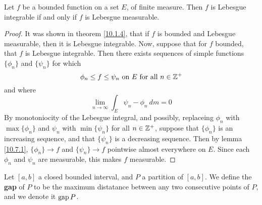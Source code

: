 \begin{theorem}\label{1.7.2}
    Let $f$ be a bounded function on a set $E$, of finite measure. Then $f$ is
    Lebesgue integrable if and only if  $f$ is Lebesgue measurable.
\end{theorem}
\begin{proof}
    It was shown in theorem \ref{10.1.4}, that if $f$ is bounded and Lebesgue
    measurable, then it is Lebesgue integrable. Now, suppose that for $f$
    bounded, that $f$ is Lebesgue integrable. Then there exists sequences of
    simple functions  $\{\phi_n\}$ and $\{\psi_n\}$ for which
    \begin{equation*}
        \phi_n \leq f \leq \psi_n \text{ on } E \text{ for all } n \in \mathbb{Z}^+
    \end{equation*}
    and where
    \begin{equation*}
        \lim_{n \xrightarrow{} \infty}{\int_E{\psi_n-\phi_n \ dm}}=0
    \end{equation*}
    By monotoniocity of the Lebesgue integral, and possibly, replaceing $\phi_n$
    with $\max{\{\phi_n\}}$ and $\psi_n$ with  $\min{\{\psi_n\}}$ for all $n \in
    \mathbb{Z}^+$, suppose that  $\{\phi_n\}$ is an increasing sequence, and that
    $\{\psi_n\}$ is a decreasing sequence. Then by lemma \ref{10.7.1},
    $\{\phi_n\} \xrightarrow{} f$ and $\{\psi_n\} \xrightarrow{} f$ pointwise
    almost everywhere on $E$. Since each  $\phi_n$ and  $\psi_n$ are measurable,
    this makes  $f$ measurable.
\end{proof}

\begin{definition}
    Let $[a,b]$ a closed bounded interval, and $P$ a partition of  $[a,b]$. We
    define the \textbf{gap} of $P$ to be the maximum distatance between any two
    consecutive points of $P$, and we denote it $\operatorname{gap}{P}$.
\end{definition}

